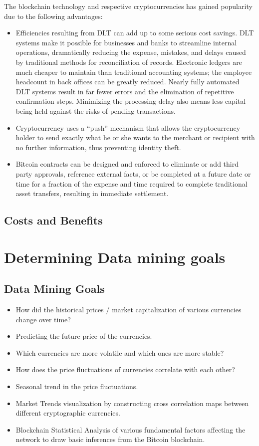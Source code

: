 \documentclass{article}
\begin{document}
The blockchain technology and respective cryptocurrencies has gained popularity due to the following advantages:
\begin{itemize}
    \item Efficiencies resulting from DLT can add up to some serious cost savings. DLT systems make it possible for businesses and banks to streamline internal operations, dramatically reducing the expense, mistakes, and delays caused by traditional methods for reconciliation of records. Electronic ledgers are much cheaper to maintain than traditional accounting systems; the employee headcount in back offices can be greatly reduced. Nearly fully automated DLT systems result in far fewer errors and the elimination of repetitive confirmation steps. Minimizing the processing delay also means less capital being held against the risks of pending transactions.
    
    \item Cryptocurrency uses a “push” mechanism that allows the cryptocurrency holder to send exactly what he or she wants to the merchant or recipient with no further information, thus preventing identity theft.
    
    \item Bitcoin contracts can be designed and enforced to eliminate or add third party approvals, reference external facts, or be completed at a future date or time for a fraction of the expense and time required to complete traditional asset transfers, resulting in immediate settlement.
\end{itemize}

\subsection{Costs and Benefits}

\section{Determining Data mining goals}
\subsection{Data Mining Goals}
\begin{itemize}
\item How did the historical prices / market capitalization of various currencies change over time?
\item Predicting the future price of the currencies.
\item Which currencies are more volatile and which ones are more stable?
\item How does the price fluctuations of currencies correlate with each other?
\item Seasonal trend in the price fluctuations.
\item Market Trends visualization by constructing cross correlation maps between different cryptographic currencies. 
\item Blockchain Statistical Analysis of various fundamental factors affecting the network to draw basic inferences from the Bitcoin blockchain.
\end{itemize}
\end{document}
